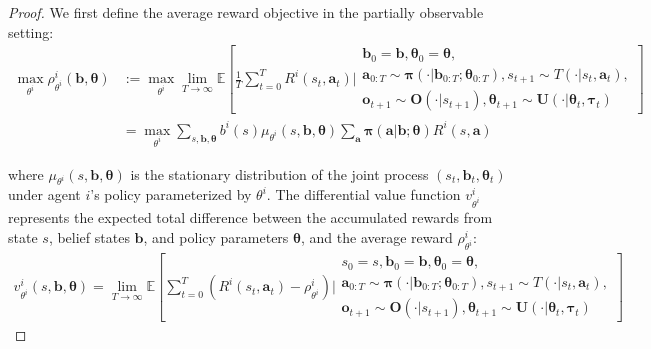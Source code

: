 \begin{proof}
    We first define the average reward objective in the partially observable setting:
    \begin{align}
        \max_{\theta^i}\rho^{i}_{\theta^i}(\boldsymbol{b}, \boldsymbol{\theta}) & := \max_{\theta^i}\lim_{T \to \infty}\mathbb{E}\left[ \frac{1}{T}\sum_{t=0}^{T} R^{i}(s_{t}, \boldsymbol{a}_{t}) \bigg| \begin{array}{c}\boldsymbol{b}_0= \boldsymbol{b}, \boldsymbol{\theta}_0= \boldsymbol{\theta}, \\ \boldsymbol{a}_{0:T} \sim \boldsymbol{\pi}(\cdot|\boldsymbol{b}_{0:T}; \boldsymbol{\theta}_{0:T}), s_{t+1} \sim T(\cdot|s_t, \boldsymbol{a}_t), \\ \boldsymbol{o}_{t+1} \sim \boldsymbol{O}(\cdot|s_{t+1}), \boldsymbol{\theta}_{t+1} \sim \boldsymbol{U}(\cdot|\boldsymbol{\theta}_t, \boldsymbol{\tau}_t)\end{array} \right] \\
                                                                                & = \max_{\theta^i}\sum_{s, \boldsymbol{b}, \boldsymbol{\theta}}b^{i}(s) \mu_{\theta^i}(s, \boldsymbol{b}, \boldsymbol{\theta}) \sum_{\boldsymbol{a}}\boldsymbol{\pi}(\boldsymbol{a}|\boldsymbol{b}; \boldsymbol{\theta}) R^{i}(s, \boldsymbol{a})
    \end{align}

    where $\mu_{\theta^i}(s, \boldsymbol{b}, \boldsymbol{\theta})$ is the stationary
    distribution of the joint process $(s_{t}, \boldsymbol{b}_{t}, \boldsymbol{\theta}
        _{t})$ under agent $i$'s policy parameterized by $\theta^{i}$. The
    differential value function $v^{i}_{\theta^i}$ represents the expected total
    difference between the accumulated rewards from state $s$, belief states $\boldsymbol
        {b}$, and policy parameters $\boldsymbol{\theta}$, and the average reward $\rho
        ^{i}_{\theta^i}$:
    \begin{align}
        v^{i}_{\theta^i}(s, \boldsymbol{b}, \boldsymbol{\theta}) = \lim_{T \to \infty}\mathbb{E}\left[ \sum_{t=0}^{T} \left(R^{i}(s_{t}, \boldsymbol{a}_{t}) - \rho^{i}_{\theta^i}\right) \bigg| \begin{array}{c}s_0=s, \boldsymbol{b}_0= \boldsymbol{b}, \boldsymbol{\theta}_0= \boldsymbol{\theta}, \\ \boldsymbol{a}_{0:T} \sim \boldsymbol{\pi}(\cdot|\boldsymbol{b}_{0:T}; \boldsymbol{\theta}_{0:T}), s_{t+1} \sim T(\cdot|s_t, \boldsymbol{a}_t), \\ \boldsymbol{o}_{t+1} \sim \boldsymbol{O}(\cdot|s_{t+1}), \boldsymbol{\theta}_{t+1} \sim \boldsymbol{U}(\cdot|\boldsymbol{\theta}_t, \boldsymbol{\tau}_t)\end{array} \right]
    \end{align}


\end{proof}
